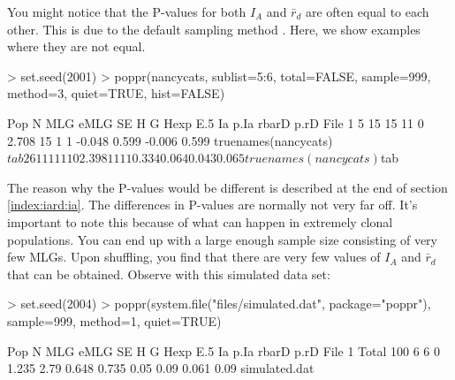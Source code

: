 \documentclass[letterpaper]{article}
\begin{document}
You might notice that the P-values for both $I_A$ and $\bar r_d$ are often equal to each other. This is due to the default sampling method \cite{Agapow:2001}. Here, we show examples where they are not equal.
\begin{Schunk}
\begin{Sinput}
> set.seed(2001)
> poppr(nancycats, sublist=5:6, total=FALSE, sample=999, method=3, quiet=TRUE, hist=FALSE)
\end{Sinput}
\end{Schunk}
\begin{Schunk}
\begin{Soutput}
  Pop  N MLG eMLG SE     H  G Hexp E.5     Ia  p.Ia  rbarD  p.rD                     File
1   5 15  15   11  0 2.708 15    1   1 -0.048 0.599 -0.006 0.599 truenames(nancycats)$tab
2   6 11  11   11  0 2.398 11    1   1  0.334 0.064  0.043 0.065 truenames(nancycats)$tab
\end{Soutput}
\end{Schunk}
The reason why the P-values would be different is described at the end of section \ref{index:iard:ia}. The differences in P-values are normally not very far off. It's important to note this because of what can happen in extremely clonal populations. You can end up with a large enough sample size consisting of very few MLGs. Upon shuffling, you find that there are very few values of $I_A$ and $\bar r_d$ that can be obtained. Observe with this simulated data set:
\begin{Schunk}
\begin{Sinput}
> set.seed(2004)
> poppr(system.file("files/simulated.dat", package="poppr"), sample=999, method=1, quiet=TRUE)
\end{Sinput}
\end{Schunk}
\begin{Schunk}
\begin{Soutput}
    Pop   N MLG eMLG SE     H    G  Hexp   E.5   Ia p.Ia rbarD p.rD          File
1 Total 100   6    6  0 1.235 2.79 0.648 0.735 0.05 0.09 0.061 0.09 simulated.dat
\end{Soutput}
\end{Schunk}
\end{document}
